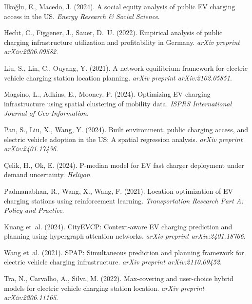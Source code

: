 Ilkoğlu, E., Macedo, J. (2024). A social equity analysis of public EV charging access in the US.
\textit{Energy Research \& Social Science}.

Hecht, C., Figgener, J., Sauer, D.~U. (2022). Empirical analysis of public charging infrastructure utilization and profitability in Germany.
\textit{arXiv preprint arXiv:2206.09582}.

Liu, S., Lin, C., Ouyang, Y. (2021). A network equilibrium framework for electric vehicle charging station location planning.
\textit{arXiv preprint arXiv:2102.05851}.

Magsino, L., Adkins, E., Mooney, P. (2024). Optimizing EV charging infrastructure using spatial clustering of mobility data.
\textit{ISPRS International Journal of Geo-Information}.

Pan, S., Liu, X., Wang, Y. (2024). Built environment, public charging access, and electric vehicle adoption in the US: A spatial regression analysis.
\textit{arXiv preprint arXiv:2401.17456}.

Çelik, H., Ok, E. (2024). P-median model for EV fast charger deployment under demand uncertainty.
\textit{Heliyon}.

Padmanabhan, R., Wang, X., Wang, F. (2021). Location optimization of EV charging stations using reinforcement learning.
\textit{Transportation Research Part A: Policy and Practice}.

Kuang et~al. (2024). CityEVCP: Context-aware EV charging prediction and planning using hypergraph attention networks.
\textit{arXiv preprint arXiv:2401.18766}.

Wang et~al. (2021). SPAP: Simultaneous prediction and planning framework for electric vehicle charging infrastructure.
\textit{arXiv preprint arXiv:2110.09452}.

Tra, N., Carvalho, A., Silva, M. (2022). Max-covering and user-choice hybrid models for electric vehicle charging station location.
\textit{arXiv preprint arXiv:2206.11165}.

